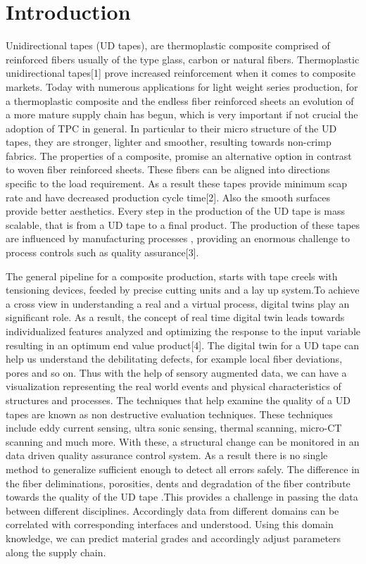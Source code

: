 

    \chapter{Introduction}
Unidirectional tapes (UD tapes), are thermoplastic composite comprised of reinforced fibers usually of the type glass, carbon or natural fibers. Thermoplastic unidirectional tapes[1] prove increased reinforcement when it comes to composite markets. Today with numerous applications for light weight series production, for a thermoplastic composite and the endless fiber reinforced sheets an evolution of a more mature supply chain has begun, which is very important if not crucial the adoption of TPC in general. In particular to their micro structure of the UD tapes, they are stronger, lighter and smoother, resulting towards non-crimp fabrics. The properties of a composite, promise an alternative option in contrast to woven  fiber reinforced sheets. These fibers can be aligned into directions specific to the load requirement. As a result these tapes provide minimum scap rate and have decreased production cycle time[2].  Also the smooth surfaces provide better aesthetics. Every step in the production of the UD tape is mass scalable, that is from a UD tape to a final product. The production of these tapes are influenced by manufacturing processes , providing an enormous challenge to process controls such as quality assurance[3].

	The general pipeline for a composite production, starts with tape creels with tensioning devices, feeded by precise cutting units and a lay up system.To achieve a cross view in understanding a real and a virtual process, digital twins play an significant role. As a result, the concept of real time digital twin leads towards individualized features analyzed and optimizing the response to the input variable resulting in an optimum end value product[4]. The digital twin for a UD tape can help us understand the debilitating defects, for example local fiber deviations, pores and so on. Thus with the help of sensory augmented data, we can have a visualization representing the real world events and physical characteristics of structures and processes. The techniques that help examine the quality of a UD tapes are known as non destructive evaluation techniques. These techniques include eddy current sensing, ultra sonic sensing, thermal scanning, micro-CT scanning and much more. With these, a structural change can be monitored in an data driven quality assurance control system. As a result there is no single method to generalize sufficient enough to detect all errors safely. The difference in the fiber deliminations, porosities, dents and degradation of the fiber contribute towards the quality of the UD tape .This provides a challenge in passing the data between different disciplines. Accordingly data from different domains can be correlated with corresponding interfaces and understood. Using this domain knowledge, we can predict material grades and accordingly adjust parameters along the supply chain. 
	
